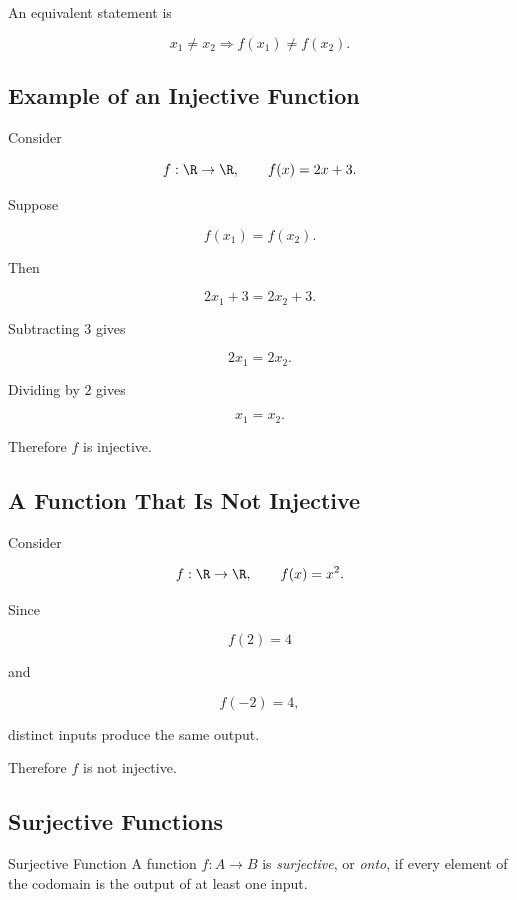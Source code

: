 An equivalent statement is

\[ x_1\neq x_2\Longrightarrow f(x_1)\neq f(x_2). \]

\subsection{Example of an Injective Function}
\label{subsec:injective-example}

Consider

\[ f:\R\to\R,\qquad f(x)=2x+3. \]

Suppose

\[ f(x_1)=f(x_2). \]

Then

\[ 2x_1+3=2x_2+3. \]

Subtracting \(3\) gives

\[ 2x_1=2x_2. \]

Dividing by \(2\) gives

\[ x_1=x_2. \]

Therefore \(f\) is injective.

\subsection{A Function That Is Not Injective}
\label{subsec:not-injective-example}

Consider

\[ f:\R\to\R,\qquad f(x)=x^2. \]

Since

\[ f(2)=4 \]

and

\[ f(-2)=4, \]

distinct inputs produce the same output.

Therefore \(f\) is not injective.

\subsection{Surjective Functions}
\label{subsec:surjective-functions}

\begin{definitionbox}{Surjective Function}
A function \(f:A\to B\) is \emph{surjective}, or \emph{onto}, if every
element of the codomain is the output of at least one input.
\end{definitionbox}

